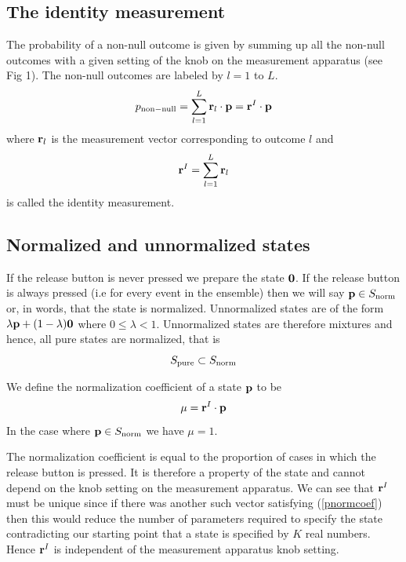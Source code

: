 \documentclass[12pt]{article}
\begin{document}
\subsection{The identity measurement}

The probability of a non-null outcome is given by summing up all the
non-null outcomes with a given setting of the knob on the measurement
apparatus (see Fig 1).  The non-null outcomes are labeled by $l=1$ to
$L$.
\begin{equation}\label{nonnull}
p_{\rm non-null} = \sum_{l=1}^L {\bf r}_l \cdot {\bf p}
={\bf r}^I \cdot {\bf p}
\end{equation}
where ${\bf r}_l$ is the measurement vector corresponding to outcome
$l$ and
\begin{equation}\label{identM}
{\bf r}^I = \sum_{l=1}^L {\bf r}_l
\end{equation}
is called the identity measurement.

\subsection{Normalized and unnormalized states}

If the release button is never pressed we prepare the state $\bf 0$.
If the release button is always pressed (i.e for every event in the
ensemble) then we will say ${\bf p}\in S_{\rm norm}$ or, in words, that the
state is normalized.
Unnormalized states are of the form $\lambda {\bf p} +(1-\lambda) {\bf
0}$ where $0\leq \lambda < 1$.  Unnormalized states are therefore
mixtures and hence, all pure states are normalized, that is
\[ S_{\rm pure} \subset S_{\rm norm}  \]

We define the normalization coefficient of a state ${\bf p}$ to be
\begin{equation}\label{pnormcoef}
     \mu = {\bf r}^I\cdot {\bf p}
\end{equation}
In the case where ${\bf p} \in S_{\rm norm}$ we have $\mu=1$.

The normalization coefficient is equal to the proportion of cases in
which the release button is pressed.  It is therefore a property of the
state and cannot depend on the knob setting on the measurement
apparatus.   We can see that ${\bf r}^I$ must be unique since if there
was another such vector satisfying (\ref{pnormcoef}) then this would
reduce the number of parameters required to specify the state
contradicting our starting point that a state is specified by $K$
real numbers. Hence ${\bf r}^I$ is independent of the measurement apparatus
knob setting.
\end{document}
